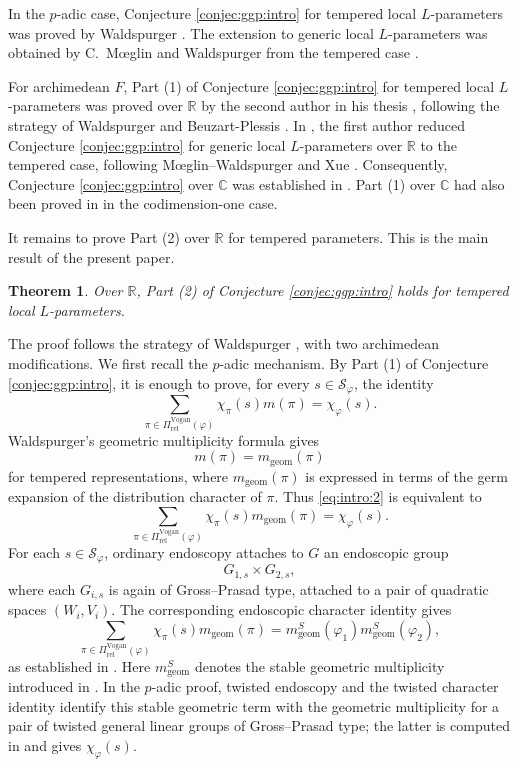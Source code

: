 \documentclass[12pt]{amsart}
\numberwithin{equation}{subsection}
\newcommand{\BC}{{\mathbb {C}}}
\newcommand{\BR}{{\mathbb {R}}}
\newcommand{\CS}{{\mathcal {S}}}
\def\vphi{\varphi}
\def\geom{\mathrm{geom}}
\def\Vg{\mathrm{Vogan}}
\def\rel{\mathrm{rel}}
\newtheorem{thm}{Theorem}[subsection]
\begin{document}
In the $p$-adic case, Conjecture \ref{conjec:ggp:intro} for tempered local
$L$-parameters was proved by Waldspurger
\cite{waldspurger10,MR3155344,MR3155345,waldspurgertemperedggp,MR3202559}.
The extension to generic local $L$-parameters was obtained by C.~M\oe glin and
Waldspurger from the tempered case \cite{MR3155346}.

For archimedean $F$, Part (1) of Conjecture \ref{conjec:ggp:intro} for tempered
local $L$-parameters was proved over $\BR$ by the second author in his thesis
\cite{thesis_zhilin}, following the strategy of Waldspurger and
Beuzart-Plessis \cite{beuzart2015local}. In \cite{chen2021local}, the first
author reduced Conjecture \ref{conjec:ggp:intro} for generic local
$L$-parameters over $\BR$ to the tempered case, following M\oe glin--Waldspurger
and Xue \cite{xue1besselgeneric}. Consequently, Conjecture
\ref{conjec:ggp:intro} over $\BC$ was established in \cite{chen2021local}.
Part (1) over $\BC$ had also been proved in \cite{mollers2017symmetry} in the
codimension-one case.

It remains to prove Part (2) over $\BR$ for tempered parameters. This is the
main result of the present paper.

\begin{thm}\label{thm:toprove}
Over $\BR$, Part (2) of Conjecture \ref{conjec:ggp:intro} holds for tempered
local $L$-parameters.
\end{thm}

The proof follows the strategy of Waldspurger \cite{MR3155345}, with
two archimedean modifications. We first recall the $p$-adic mechanism. By Part
(1) of Conjecture \ref{conjec:ggp:intro}, it is enough to prove, for every
$s\in \CS_\vphi$, the identity
\begin{equation}\label{eq:intro:2}
\sum_{\pi\in \Pi^\Vg_{\rel}(\vphi)}
\chi_{\pi}(s)m(\pi)
=
\chi_{\vphi}(s).
\end{equation}
Waldspurger's geometric multiplicity formula
\cite{waldspurger10,waldspurgertemperedggp} gives
\[
m(\pi)=m_\geom(\pi)
\]
for tempered representations, where $m_\geom(\pi)$ is expressed in terms of
the germ expansion of the distribution character of $\pi$. Thus
\eqref{eq:intro:2} is equivalent to
\[
\sum_{\pi\in \Pi^\Vg_{\rel}(\vphi)}
\chi_{\pi}(s)m_\geom(\pi)
=
\chi_{\vphi}(s).
\]
For each $s\in \CS_\vphi$, ordinary endoscopy attaches to $G$ an endoscopic
group
\[
G_{1,s}\times G_{2,s},
\]
where each $G_{i,s}$ is again of Gross--Prasad type, attached to a pair of
quadratic spaces $(W_i,V_i)$. The corresponding endoscopic character identity
gives
\[
\sum_{\pi\in \Pi^\Vg_{\rel}(\vphi)}
\chi_{\pi}(s)m_\geom(\pi)
=
m^S_\geom(\vphi_1)m^S_\geom(\vphi_2),
\]
as established in \cite[Prop.~3.3]{MR3155345}. Here $m^S_\geom$ denotes the
stable geometric multiplicity introduced in \cite[\S 3.2]{MR3155345}. In the
$p$-adic proof, twisted endoscopy and the twisted character identity
\cite[\S 1.6,\S 1.8]{MR3155345} identify this stable geometric term with the
geometric multiplicity for a pair of twisted general linear groups of
Gross--Prasad type; the latter is computed in \cite{MR3155344} and gives
$\chi_\vphi(s)$.
\end{document}
